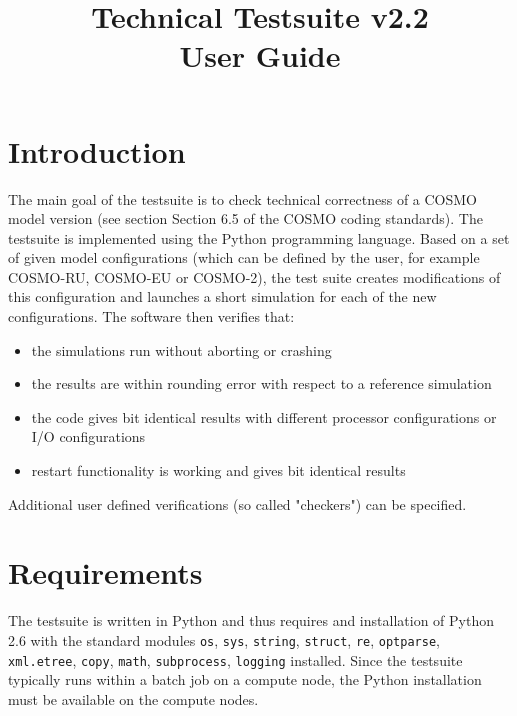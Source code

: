 \documentclass[12pt,twoside,a4paper]{report}
\title{Technical Testsuite v2.2\\User Guide}
\begin{document}
\maketitle
\setcounter{tocdepth}{1}
\tableofcontents 

\section{Introduction}

The main goal of the testsuite is to check technical correctness of a COSMO model version (see section Section 6.5 of the COSMO coding standards). The testsuite is implemented using the Python programming language.
Based on a set of given model configurations (which can be defined by the user, for example COSMO-RU, COSMO-EU or COSMO-2), the test suite creates modifications of this configuration and launches a short simulation for each of the new configurations. The software then verifies that:
\begin{itemize}
\item the simulations run without aborting or crashing
\item the results are within rounding error with respect to a reference simulation
\item the code gives bit identical results with different processor configurations or I/O configurations
\item restart functionality is working and gives bit identical results
\end{itemize}

Additional user defined verifications (so called "checkers") can be specified.

\section{Requirements}

The testsuite is written in Python and thus requires and installation of Python 2.6 with the standard modules \texttt{os}, \texttt{sys}, \texttt{string}, \texttt{struct}, \texttt{re}, \texttt{optparse}, \texttt{xml.etree}, \texttt{copy}, \texttt{math}, \texttt{subprocess}, \texttt{logging} installed. Since the testsuite typically runs within a batch job on a compute node, the Python installation must be available on the compute nodes.

\end{document}
